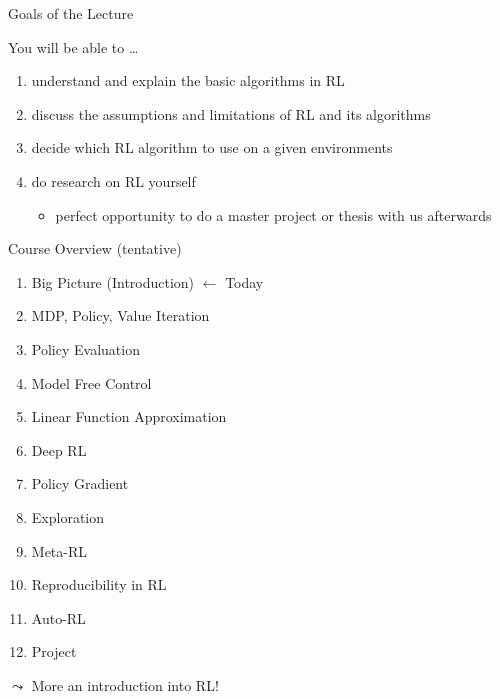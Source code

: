 \documentclass[aspectratio=169]{../latex_main/tntbeamer}  %
\begin{document}
\begin{frame}[c]{Goals of the Lecture}
	
	You will be able to \ldots
	\begin{enumerate}
		\item \alert{understand} and \alert{explain} the basic algorithms in RL
		\smallskip
		\item \alert{discuss} the assumptions and limitations of RL and its algorithms
		\smallskip
		\item  \alert{decide} which RL algorithm to use on a given environments
		\smallskip
		\item \alert{do} research on RL yourself
		\begin{itemize}
			\item perfect opportunity to do a master project or thesis with us afterwards
		\end{itemize}
	\end{enumerate}
	
\end{frame}
\begin{frame}[c]{Course Overview (tentative)}
	
	\begin{enumerate}
		\item Big Picture (Introduction) $\xleftarrow{}$ Today
		\item MDP, Policy, Value Iteration
		\item Policy Evaluation
		\item Model Free Control
		\item Linear Function Approximation
		\item Deep RL
		\item Policy Gradient
		\item Exploration
		\item Meta-RL
		\item Reproducibility in RL
		\item Auto-RL
		\item Project
	\end{enumerate}
	
	\pause
	$\leadsto$ \alert{More an introduction into RL!}
	
\end{frame}
\end{document}
